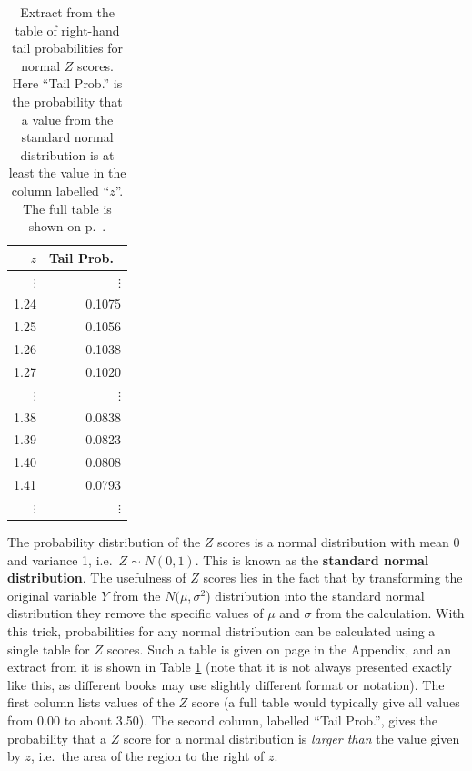 \begin{table}
\caption{Extract from the table of right-hand tail probabilities for
normal $Z$ scores. Here ``Tail Prob.'' is the probability that a
value from the standard normal distribution is at least the value
in the column labelled ``$z$''. The full table is shown on p.\
\pageref{s_disttables_Z}.}
\label{t_normtab}
\begin{center}
{\footnotesize
\begin{tabular}{|r|r|}\hline
\rule[1ex]{0mm}{2ex}$z$ & Tail Prob.\ \\
\hline
$\vdots$ & $\vdots$\\
1.24 & 0.1075 \\
1.25 & 0.1056 \\
1.26 & 0.1038 \\
1.27 & 0.1020 \\
$\vdots$ & $\vdots$ \\
1.38 & 0.0838\\
1.39 & 0.0823\\
1.40 & 0.0808\\
1.41 & 0.0793\\
$\vdots$ & $\vdots$ \\
\hline
\end{tabular}
}
\end{center}
\end{table}

The probability distribution of the $Z$ scores is a normal distribution
with mean 0 and variance 1, i.e.\ $Z\sim N(0,1)$. This is known as the
\textbf{standard normal distribution}. The usefulness of $Z$ scores lies
in the fact that by transforming the original variable $Y$ from the
$N(\mu, \sigma^{2}$) distribution into the standard normal distribution
they remove the specific values of $\mu$ and $\sigma$ from the
calculation. With this trick, probabilities for any normal distribution
can be calculated using a single table for $Z$ scores.
Such a table is given on page
\pageref{s_disttables_Z} in the Appendix, and an extract from it is
shown in Table
\ref{t_normtab} (note that it is not
always presented exactly like this, as different books may use slightly
different format or notation). The first column lists values of the $Z$
score (a full table would typically give
all values from 0.00 to about 3.50). The second column, labelled
``Tail Prob.'', gives the probability that a $Z$ score for a normal
distribution is \emph{larger than} the value given by $z$, i.e.\ the area of
the region to the right of $z$.

